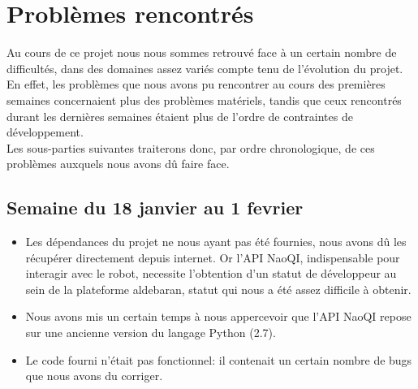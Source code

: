 \section{Problèmes rencontrés}
\label{sec:Problèmes rencontrés}

  \par Au cours de ce projet nous nous sommes retrouvé face à un certain nombre de difficultés, dans des domaines assez variés compte tenu de l'évolution du projet.
  En effet, les problèmes que nous avons pu rencontrer au cours des premières semaines concernaient plus des problèmes matériels,
  tandis que ceux rencontrés durant les dernières semaines étaient plus de l'ordre de contraintes de développement.\\
  Les sous-parties suivantes traiterons donc, par ordre chronologique, de ces problèmes auxquels nous avons dû faire face.\\

  \subsection{Semaine du 18 janvier au 1 fevrier}
    \label{sub:Semaine du 18 janvier au 1 fevrier}
    \begin{itemize}
      \item Les dépendances du projet ne nous ayant pas été fournies, nous avons dû les récupérer directement depuis internet.
      Or l'API NaoQI, indispensable pour interagir avec le robot, necessite l'obtention d'un statut de développeur au sein de la plateforme aldebaran, statut qui nous a été assez difficile à obtenir.
      \item Nous avons mis un certain temps à nous appercevoir que l'API NaoQI repose sur une ancienne version du langage Python (2.7).
      \item Le code fourni n'était pas fonctionnel: il contenait un certain nombre de bugs que nous avons du corriger.\\
    \end{itemize}



